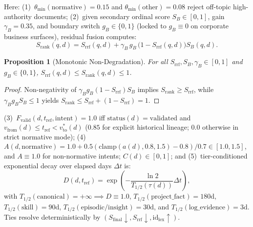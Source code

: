\documentclass[10pt,twocolumn]{article}
\newtheorem{proposition}{Proposition}
\begin{document}
Here: (1)~$\theta_{\min}(\text{normative}) = 0.15$ and $\theta_{\min}(\text{other}) = 0.08$ reject off-topic high-authority documents; (2)~given secondary ordinal score $S_B \in [0,1]$, gain $\gamma_B = 0.35$, and boundary switch $g_B \in \{0,1\}$ (locked to $g_B \equiv 0$ on corporate business surfaces), residual fusion computes:
\begin{equation}
S_{\mathrm{rank}}(q,d) = S_{\mathrm{rrf}}(q,d) + \gamma_B \, g_B \, \bigl(1 - S_{\mathrm{rrf}}(q,d)\bigr) S_B(q,d).
\end{equation}
\begin{proposition}[Monotonic Non-Degradation]
For all $S_{\mathrm{rrf}}, S_B, \gamma_B \in [0,1]$ and $g_B \in \{0,1\}$, $S_{\mathrm{rrf}}(q,d) \le S_{\mathrm{rank}}(q,d) \le 1$.
\end{proposition}
\begin{proof}
Non-negativity of $\gamma_B g_B (1 - S_{\mathrm{rrf}}) S_B$ implies $S_{\mathrm{rank}} \ge S_{\mathrm{rrf}}$, while $\gamma_B g_B S_B \le 1$ yields $S_{\mathrm{rank}} \le S_{\mathrm{rrf}} + (1 - S_{\mathrm{rrf}}) = 1$.
\end{proof}
(3)~$F_{\mathrm{valid}}(d, t_{\mathrm{ref}}, \mathrm{intent}) = 1.0$ iff $\mathrm{status}(d)=\text{validated}$ and $v_{\mathrm{from}}(d) \le t_{\mathrm{ref}} < v_{\mathrm{to}}^{*}(d)$ ($0.85$ for explicit historical lineage; $0.0$ otherwise in strict normative mode); (4)~$A(d, \text{normative}) = 1.0 + 0.5(\mathrm{clamp}(a(d), 0.8, 1.5)-0.8)/0.7 \in [1.0, 1.5]$, and $A \equiv 1.0$ for non-normative intents; $C(d) \in [0,1]$; and (5)~tier-conditioned exponential decay over elapsed days $\Delta t$ is:
\begin{equation}
D(d, t_{\mathrm{ref}}) = \exp\!\left(-\frac{\ln 2}{T_{1/2}(\tau(d))} \Delta t\right),
\end{equation}
with $T_{1/2}(\text{canonical}) = +\infty \implies D \equiv 1.0$, $T_{1/2}(\text{project\_fact})=180\text{d}$, $T_{1/2}(\text{skill})=90\text{d}$, $T_{1/2}(\text{episodic/insight})=30\text{d}$, and $T_{1/2}(\text{log\_evidence})=3\text{d}$. Ties resolve deterministically by $(S_{\mathrm{final}} \downarrow, S_{\mathrm{rrf}} \downarrow, \mathrm{id}_{\mathrm{lex}} \uparrow)$.
\end{document}

